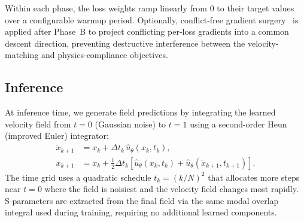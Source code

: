 Within each phase, the loss weights ramp linearly from 0 to their target values over a configurable warmup period.
Optionally, conflict-free gradient surgery~\cite{ConFIG2025} is applied after Phase~B to project conflicting
per-loss gradients into a common descent direction, preventing destructive interference between the velocity-matching
and physics-compliance objectives.

\subsection{Inference}

At inference time, we generate field predictions by integrating the learned velocity field from $t = 0$ (Gaussian
noise) to $t = 1$ using a second-order Heun (improved Euler) integrator:
\begin{align}
    \tilde{x}_{k+1} &= x_k + \Delta t_k\, \hat{u}_\theta(x_k, t_k), \nonumber\\
    x_{k+1} &= x_k + \tfrac{1}{2}\Delta t_k\!\left[\hat{u}_\theta(x_k, t_k)
               + \hat{u}_\theta(\tilde{x}_{k+1}, t_{k+1})\right].
    \label{eq:heun}
\end{align}
The time grid uses a quadratic schedule $t_k = (k/N)^2$ that allocates more steps near $t = 0$ where the field
is noisiest and the velocity field changes most rapidly. S-parameters are extracted from the final field via the same
modal overlap integral used during training, requiring no additional learned components.
